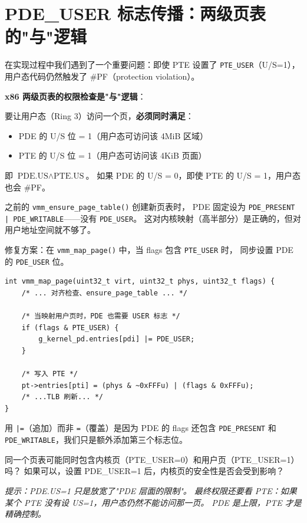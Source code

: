 \section{PDE\_USER 标志传播：两级页表的"与"逻辑}
\label{sec:tss-pde-user}

在实现过程中我们遇到了一个重要问题：即使 PTE 设置了 \texttt{PTE\_USER}（U/S=1），
用户态代码仍然触发了 \#PF（protection violation）。

\begin{warnbox}
\textbf{x86 两级页表的权限检查是"与"逻辑}：

要让用户态（Ring 3）访问一个页，\textbf{必须同时满足}：
\begin{itemize}
  \item PDE 的 U/S 位 = 1（用户态可访问该 4MiB 区域）
  \item PTE 的 U/S 位 = 1（用户态可访问该 4KiB 页面）
\end{itemize}

即 $\text{PDE.US} \land \text{PTE.US}$。
如果 PDE 的 U/S = 0，即使 PTE 的 U/S = 1，用户态也会 \#PF。
\end{warnbox}

之前的 \texttt{vmm\_ensure\_page\_table()} 创建新页表时，
PDE 固定设为 \texttt{PDE\_PRESENT | PDE\_WRITABLE}——没有 \texttt{PDE\_USER}。
这对内核映射（高半部分）是正确的，但对用户地址空间就不够了。

修复方案：在 \texttt{vmm\_map\_page()} 中，当 flags 包含 \texttt{PTE\_USER} 时，
同步设置 PDE 的 \texttt{PDE\_USER} 位。

\begin{lstlisting}[style=cstyle]
int vmm_map_page(uint32_t virt, uint32_t phys, uint32_t flags) {
    /* ... 对齐检查、ensure_page_table ... */

    /* 当映射用户页时，PDE 也需要 USER 标志 */
    if (flags & PTE_USER) {
        g_kernel_pd.entries[pdi] |= PDE_USER;
    }

    /* 写入 PTE */
    pt->entries[pti] = (phys & ~0xFFFu) | (flags & 0xFFFu);
    /* ...TLB 刷新... */
}
\end{lstlisting}

用 \texttt{|=}（追加）而非 \texttt{=}（覆盖）是因为 PDE 的 flags 还包含
\texttt{PDE\_PRESENT} 和 \texttt{PDE\_WRITABLE}，我们只是额外添加第三个标志位。

\begin{thinkbox}
同一个页表可能同时包含内核页（PTE\_USER=0）和用户页（PTE\_USER=1）吗？
如果可以，设置 PDE\_USER=1 后，内核页的安全性是否会受到影响？

\emph{提示：PDE.US=1 只是放宽了"PDE 层面的限制"。
最终权限还要看 PTE：如果某个 PTE 没有设 US=1，用户态仍然不能访问那一页。
PDE 是上限，PTE 才是精确控制。}
\end{thinkbox}
